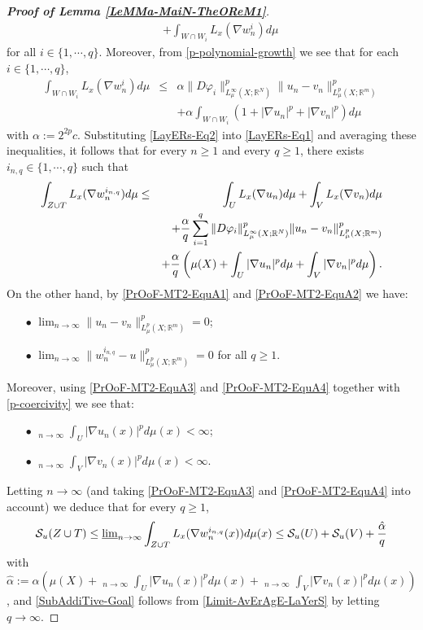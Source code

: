 \documentclass[10pt]{amsart}
\numberwithin{equation}{section}
\theoremstyle{definition}
\theoremstyle{remark}
\begin{document}
\begin{proof}[\bf Proof of Lemma \ref{LeMMa-MaiN-TheOReM1}]
\begin{eqnarray}
&&+\int_{W\cap W_i}L_x(\nabla w^i_n)d\mu\nonumber
\end{eqnarray}
for all $i\in\{1,\cdots,q\}$. Moreover, from \eqref{p-polynomial-growth} we see that for each $i\in\{1,\cdots,q\}$,
\begin{eqnarray}
\int_{W\cap W_i}L_x(\nabla w^i_n)d\mu&\leq&\alpha\|D\varphi_i\|^p_{L^\infty_\mu(X;{{\mathbb R}}^N)}\|u_n-v_n\|^p_{L^p_\mu(X;{{\mathbb R}}^m)}\label{LayERs-Eq2}\\
&&+\alpha\int_{W\cap W_i}(1+|\nabla u_n|^p+|\nabla v_n|^p)d\mu\nonumber
\end{eqnarray}
with $\alpha:=2^{2p}c$. Substituting \eqref{LayERs-Eq2} into \eqref{LayERs-Eq1} and averaging these inequalities, it follows that for every $n\geq 1$ and every $q\geq 1$, there exists $i_{n,q}\in\{1,\cdots,q\}$ such that
\begin{eqnarray}
\int_{Z\cup T}L_x(\nabla w_n^{i_{n,q}})d\mu&\leq&\int_UL_x(\nabla u_n)d\mu+\int_VL_x(\nabla v_n)d\mu\nonumber\\
&&+{\alpha\over q}\sum_{i=1}^q\|D\varphi_i\|^p_{L^\infty_\mu(X;{{\mathbb R}}^N)}\|u_n-v_n\|^p_{L^p_\mu(X;{{\mathbb R}}^m)}\nonumber\\
&&+{\alpha\over q}\left(\mu(X)+\int_U|\nabla u_n|^pd\mu+\int_V|\nabla v_n|^pd\mu\right).\nonumber
\end{eqnarray}
On the other hand, by \eqref{PrOoF-MT2-EquA1} and \eqref{PrOoF-MT2-EquA2} we have:
\begin{itemize}
\item[$\bullet$] $\displaystyle\lim_{n\to\infty}\|u_n-v_n\|^p_{L^p_\mu(X;{{\mathbb R}}^m)}=0$;
\item[$\bullet$] $\displaystyle\lim_{n\to\infty}\|w_n^{i_{n,q}}-u\|^p_{L^p_\mu(X;{{\mathbb R}}^m)}=0$ for all $q\geq 1$.
\end{itemize}
Moreover, using \eqref{PrOoF-MT2-EquA3} and \eqref{PrOoF-MT2-EquA4} together with \eqref{p-coercivity} we see that:
\begin{itemize}
\item[$\bullet$] $\displaystyle{\mathop{\overline{\lim}}}_{n\to\infty}\int_U|\nabla u_n(x)|^pd\mu(x)<\infty$;
\item[$\bullet$] $\displaystyle{\mathop{\overline{\lim}}}_{n\to\infty}\int_V|\nabla v_n(x)|^pd\mu(x)<\infty$.
\end{itemize}
Letting $n\to\infty$ (and taking \eqref{PrOoF-MT2-EquA3} and \eqref{PrOoF-MT2-EquA4} into account) we deduce that for every $q\geq 1$,
\begin{equation}\label{Limit-AvErAgE-LaYerS}
\mathcal{S}_u(Z\cup T)\leq{\mathop{\underline{\lim}}}_{n\to\infty}\int_{Z\cup T}L_x(\nabla w_n^{i_{n,q}}(x))d\mu(x)\leq\mathcal{S}_u(U)+\mathcal{S}_u(V)+{\hat\alpha\over q}
\end{equation}
with $\hat\alpha:=\alpha(\mu(X)+{\mathop{\overline{\lim}}}_{n\to\infty}\int_U|\nabla u_n(x)|^pd\mu(x)+{\mathop{\overline{\lim}}}_{n\to\infty}\int_V|\nabla v_n(x)|^pd\mu(x))$, and \eqref{SubAddiTive-Goal} follows from \eqref{Limit-AvErAgE-LaYerS} by letting $q\to\infty$. 
\end{proof}
\end{document}
